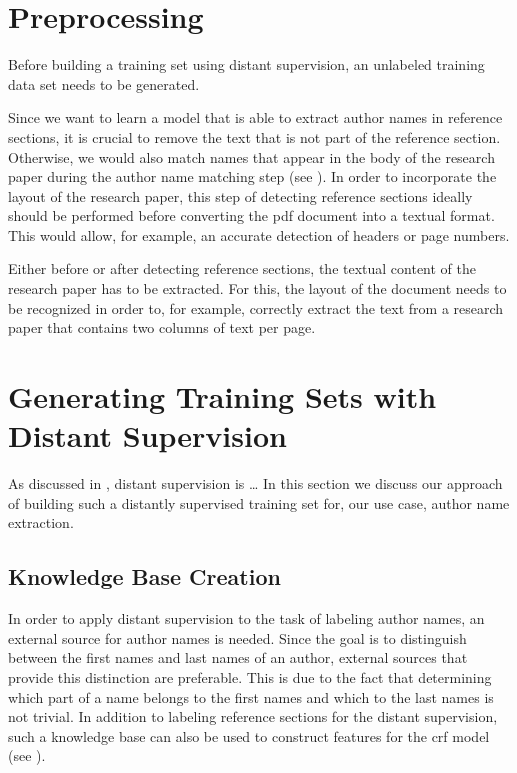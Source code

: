 \section{Preprocessing}\label{sec:ae-preprocessing}

Before building a training set using \gls{distant supervision}, an unlabeled training data set needs to be generated.

Since we want to learn a model that is able to extract author names in reference sections, it is crucial to remove the text that is not part of the reference section.
Otherwise, we would also match names that appear in the body of the research paper during the author name matching step (see ).
In order to incorporate the layout of the research paper, this step of detecting reference sections ideally should be performed before converting the \gls{pdf} document into a textual format.
This would allow, for example, an accurate detection of headers or page numbers.

\bigskip

Either before or after detecting reference sections, the textual content of the research paper has to be extracted.
For this, the layout of the document needs to be recognized in order to, for example, correctly extract the text from a research paper that contains two columns of text per page.

\section{Generating Training Sets with Distant Supervision}\label{sec:ae-distant-supervision}

As discussed in , distant supervision is \dots
In this section we discuss our approach of building such a distantly supervised training set for, our use case, author name extraction.


\subsection{Knowledge Base Creation}\label{subsec:ae-knowledge-base-creation}

In order to apply distant supervision to the task of labeling author names, an external source for author names is needed.
Since the goal is to distinguish between the first names and last names of an author, external sources that provide this distinction are preferable.
This is due to the fact that determining which part of a name belongs to the first names and which to the last names is not trivial.
In addition to labeling reference sections for the distant supervision, such a knowledge base can also be used to construct features for the \gls{crf} model (see ).

